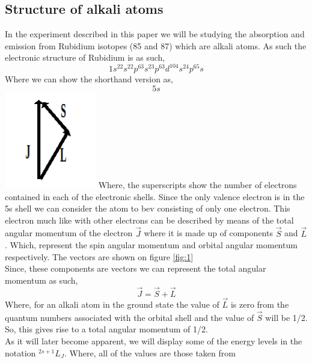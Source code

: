 \documentclass[twocolumn]{article}
\begin{document}
\subsection{Structure of alkali atoms}
In the experiment described in this paper we will be studying the absorption 
and emission from Rubidium isotopes (85 and 87) which are alkali atoms. As such the electronic structure of Rubidium is as such,
\begin{equation*}
1s^22s^22p^63s^23p^63d^104s^24p^65s
\end{equation*}
Where we can show the shorthand version as,
\begin{equation*}
[Kr]5s
\end{equation*}
\center
\includegraphics[width=0.3\linewidth]{pictures/electron-angular-momentum.png}
\label{fig:1}
\justify
Where, the superscripts show the number of electrons contained in each of the 
electronic shells. Since the only valence electron is in the 5s shell we can 
consider the atom to bev consisting of only one electron. This electron much 
like with other 
electrons can be described by means of the total angular momentum of the 
electron $\vec{J}$ where it is made up of components $\vec{S}$ and 
$\vec{L}$. Which, represent the spin angular momentum and orbital angular 
momentum respectively. The vectors are shown on figure \ref{fig:1}
\\
Since, these components are vectors we can represent the total angular momentum 
as such,
\begin{equation}
\vec{J} = \vec{S}+\vec{L}
\label{eqn:1}
\end{equation}
\justify
Where, for an alkali atom in the ground state the value of $\vec{L}$ is zero 
from the quantum numbers associated with the orbital shell and the value of 
$\vec{S}$ will be 1/2. So, this gives rise to a total angular momentum of 1/2.
\\
As it will later become apparent, we will display some of the energy levels in 
the notation $^{2s+1}L_J$. Where, all of the values are those taken from 
\end{document}
